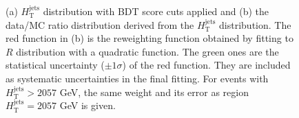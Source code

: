 \begin{figure}[H]
  \caption{(a) $H_{\text{T}}^{\text{jets}}$ distribution with BDT score cuts applied and (b) the data/MC ratio distribution derived from the $H_{\text{T}}^{\text{jets}}$ distribution. The red function in (b) is the reweighting function obtained by fitting to $R$ distribution with a quadratic function. The green ones are the statistical uncertainty (${\pm}1{\sigma}$) of the red function. They are included as systematic uncertainties in the final fitting. For events with $H_{\text{T}}^{\text{jets}}>2057$ GeV, the same weight and its error as region $H_{\text{T}}^{\text{jets}}=2057$ GeV is given. }
  \label{fig:HTjets_for_RW}
\end{figure}


